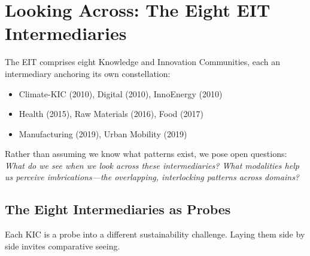 \documentclass[11pt,a4paper]{article}
\begin{document}
\section{Looking Across: The Eight EIT Intermediaries}

The EIT comprises eight Knowledge and Innovation Communities, each an intermediary anchoring its own constellation:
\begin{itemize}[noitemsep]
\item Climate-KIC (2010), Digital (2010), InnoEnergy (2010)
\item Health (2015), Raw Materials (2016), Food (2017)
\item Manufacturing (2019), Urban Mobility (2019)
\end{itemize}

Rather than assuming we know what patterns exist, we pose open questions: \textit{What do we see when we look across these intermediaries? What modalities help us perceive imbrications---the overlapping, interlocking patterns across domains?}

\subsection{The Eight Intermediaries as Probes}

Each KIC is a probe into a different sustainability challenge. Laying them side by side invites comparative seeing.
\end{document}
